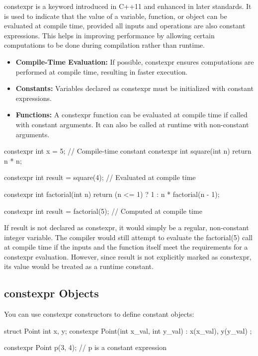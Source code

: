 \documentclass{report}
\begin{document}
     \pagebreak 
     \bigbreak \noindent 
     constexpr is a keyword introduced in C++11 and enhanced in later standards. It is used to indicate that the value of a variable, function, or object can be evaluated at compile time, provided all inputs and operations are also constant expressions. This helps in improving performance by allowing certain computations to be done during compilation rather than runtime.
     \begin{itemize}
         \item \textbf{Compile-Time Evaluation:} If possible, constexpr ensures computations are performed at compile time, resulting in faster execution.
         \item \textbf{Constants:} Variables declared as constexpr must be initialized with constant expressions.
         \item \textbf{Functions:} A constexpr function can be evaluated at compile time if called with constant arguments. It can also be called at runtime with non-constant arguments.
     \end{itemize}
     \bigbreak \noindent 
     \begin{cppcode}
         constexpr int x = 5; // Compile-time constant
         constexpr int square(int n) { return n * n; }

         constexpr int result = square(4); // Evaluated at compile time
     \end{cppcode}
     \bigbreak \noindent 
     \begin{cppcode}
     constexpr int factorial(int n) {
         return (n <= 1) ? 1 : n * factorial(n - 1);
     }

     constexpr int result = factorial(5); // Computed at compile time
 \end{cppcode}
 \bigbreak \noindent 
If result is not declared as constexpr, it would simply be a regular, non-constant integer variable. The compiler would still attempt to evaluate the factorial(5) call at compile time if the inputs and the function itself meet the requirements for a constexpr evaluation. However, since result is not explicitly marked as constexpr, its value would be treated as a runtime constant.

 \bigbreak \noindent 
 \subsection{constexpr Objects}
 \bigbreak \noindent 
 You can use constexpr constructors to define constant objects:
 \bigbreak \noindent 
 \begin{cppcode}
     struct Point {
         int x, y;
         constexpr Point(int x_val, int y_val) : x(x_val), y(y_val) {}
     };

     constexpr Point p(3, 4); // p is a constant expression
 \end{cppcode}
\end{document}
